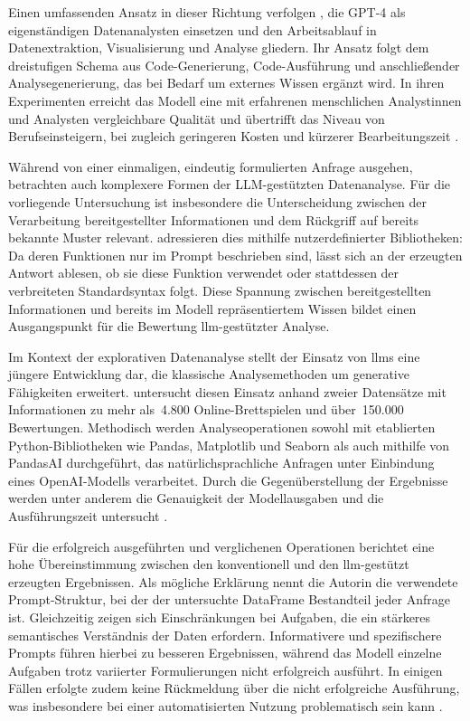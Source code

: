 Einen umfassenden Ansatz in dieser Richtung verfolgen \textcite{cheng_gpt_2023}, die GPT-4 als eigenständigen Datenanalysten einsetzen und den Arbeitsablauf in Datenextraktion, Visualisierung und Analyse gliedern. Ihr Ansatz folgt dem dreistufigen Schema aus Code-Generierung, Code-Ausführung und anschließender Analysegenerierung, das bei Bedarf um externes Wissen ergänzt wird. In ihren Experimenten erreicht das Modell eine mit erfahrenen menschlichen Analystinnen und Analysten vergleichbare Qualität und übertrifft das Niveau von Berufseinsteigern, bei zugleich geringeren Kosten und kürzerer Bearbeitungszeit \parencite{cheng_gpt_2023}.

Während \textcite{cheng_gpt_2023} von einer einmaligen, eindeutig formulierten Anfrage ausgehen, betrachten \textcite{li_tapilot-crossing_2024} auch komplexere Formen der LLM-gestützten Datenanalyse. Für die vorliegende Untersuchung ist insbesondere die Unterscheidung zwischen der Verarbeitung bereitgestellter Informationen und dem Rückgriff auf bereits bekannte Muster relevant. \textcite{li_tapilot-crossing_2024} adressieren dies mithilfe nutzerdefinierter Bibliotheken: Da deren Funktionen nur im Prompt beschrieben sind, lässt sich an der erzeugten Antwort ablesen, ob sie diese Funktion verwendet oder stattdessen der verbreiteten Standardsyntax folgt. Diese Spannung zwischen bereitgestellten Informationen und bereits im Modell repräsentiertem Wissen bildet einen Ausgangspunkt für die Bewertung \gls{llm}-gestützter Analyse.

Im Kontext der explorativen Datenanalyse stellt der Einsatz von \glspl{llm} eine jüngere Entwicklung dar, die klassische Analysemethoden um generative Fähigkeiten erweitert. \textcite{zhecheva_exploratory_2024} untersucht diesen Einsatz anhand zweier Datensätze mit Informationen zu mehr als~4.800 Online-Brettspielen und über~150.000 Bewertungen. Methodisch werden Analyseoperationen sowohl mit etablierten Python-Bibliotheken wie Pandas, Matplotlib und Seaborn als auch mithilfe von PandasAI durchgeführt, das natürlichsprachliche Anfragen unter Einbindung eines OpenAI-Modells verarbeitet. Durch die Gegenüberstellung der Ergebnisse werden unter anderem die Genauigkeit der Modellausgaben und die Ausführungszeit untersucht \parencite{zhecheva_exploratory_2024}.

Für die erfolgreich ausgeführten und verglichenen Operationen berichtet \textcite{zhecheva_exploratory_2024} eine hohe Übereinstimmung zwischen den konventionell und den \gls{llm}-gestützt erzeugten Ergebnissen.  Als mögliche Erklärung nennt die Autorin die verwendete Prompt-Struktur, bei der der untersuchte DataFrame Bestandteil jeder Anfrage ist. Gleichzeitig zeigen sich Einschränkungen bei Aufgaben, die ein stärkeres semantisches Verständnis der Daten erfordern. Informativere und spezifischere Prompts führen hierbei zu besseren Ergebnissen, während das Modell einzelne Aufgaben trotz variierter Formulierungen nicht erfolgreich ausführt. In einigen Fällen erfolgte zudem keine Rückmeldung über die nicht erfolgreiche Ausführung, was insbesondere bei einer automatisierten Nutzung problematisch sein kann \parencite{zhecheva_exploratory_2024}.

